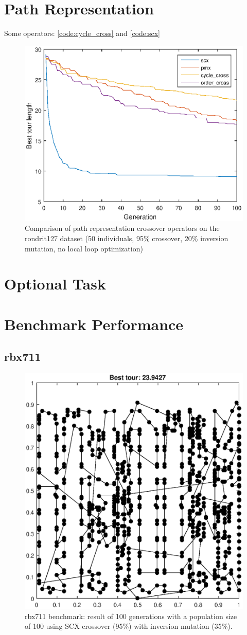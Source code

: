 \documentclass{article}
\begin{document}
\section{Path Representation}

Some operators: \ref{code:cycle_cross} and \ref{code:scx}

\begin{figure}
\centering
\includegraphics[width=.5\textwidth]{img/rondrit127-pathvs-inv-50-100-20mut-noloop.eps}
\caption{Comparison of path representation crossover operators on the rondrit127 dataset (50 individuals, 95\% crossover, 20\% inversion mutation, no local loop optimization)}
\end{figure}

\section{Optional Task}

\section{Benchmark Performance}

\subsection{rbx711}

\begin{figure}
\centering
\includegraphics[width=.5\textwidth]{img/rbx711-scx-inv-100-100-35mut-loop.eps}
\caption{rbx711 benchmark: result of 100 generations with a population size of 100 using SCX crossover (95\%) with inversion mutation (35\%).}
\end{figure}
\end{document}
